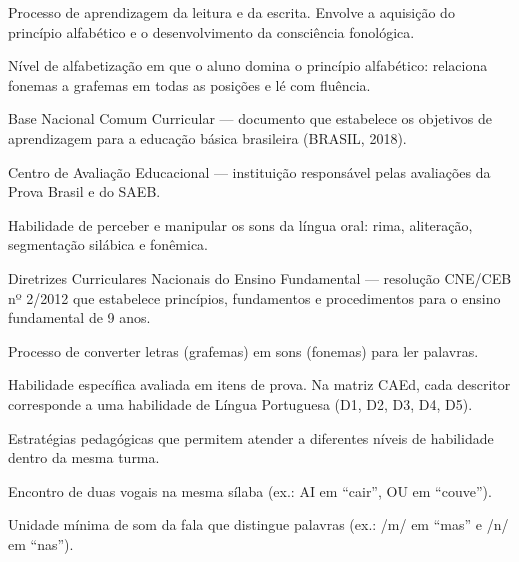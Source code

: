 \begin{description}[leftmargin=2.5cm, style=nextline]

  \item[Alfabetização] Processo de aprendizagem da leitura e da
  escrita. Envolve a aquisi\c{c}\~{a}o do princ\'{i}pio alfab\'{e}tico
  e o desenvolvimento da consci\^{e}ncia fonol\'{o}gica.

  \item[Alfabético (n\'{i}vel)] N\'{i}vel de alfabetiza\c{c}\~{a}o
  em que o aluno domina o princ\'{i}pio alfab\'{e}tico: relaciona
  fonemas a grafemas em todas as posi\c{c}\~{o}es e l\'{e} com flu\^{e}ncia.

  \item[BNCC] Base Nacional Comum Curricular --- documento que
  estabelece os objetivos de aprendizagem para a educa\c{c}\~{a}o
  b\'{a}sica brasileira (BRASIL, 2018).

  \item[CAEd] Centro de Avaliação Educacional --- institui\c{c}\~{a}o
  respons\'{a}vel pelas avalia\c{c}\~{o}es da Prova Brasil e do SAEB.

  \item[Consci\^{e}ncia Fonol\'{o}gica] Habilidade de perceber e
  manipular os sons da l\'{i}ngua oral: rima, alitera\c{c}\~{a}o,
  segmenta\c{c}\~{a}o sil\'{a}bica e fonêmica.

  \item[DCNC] Diretrizes Curriculares Nacionais do Ensino Fundamental
  --- resolu\c{c}\~{a}o CNE/CEB nº 2/2012 que estabelece princ\'{i}pios,
  fundamentos e procedimentos para o ensino fundamental de 9 anos.

  \item[Decodifica\c{c}\~{a}o] Processo de converter letras (grafemas)
  em sons (fonemas) para ler palavras.

  \item[Descritor] Habilidade espec\'{i}fica avaliada em itens de
  prova. Na matriz CAEd, cada descritor corresponde a uma habilidade
  de L\'{i}ngua Portuguesa (D1, D2, D3, D4, D5).

  \item[Diferencia\c{c}\~{a}o] Estrat\'{e}gias pedag\'{o}gicas que
  permitem atender a diferentes n\'{i}veis de habilidade dentro da
  mesma turma.

  \item[Ditongo] Encontro de duas vogais na mesma s\'{i}laba (ex.: AI
  em ``cair'', OU em ``couve'').

  \item[Fonema] Unidade m\'{i}nima de som da fala que distingue palavras
  (ex.: /m/ em ``mas'' e /n/ em ``nas'').


\end{description}
